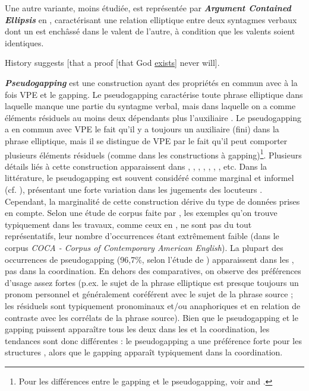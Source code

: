 Une autre variante, moins étudiée, est représentée par \textbf{\textit{Argument Contained Ellipsis}} \citep{Kennedy1994} en , caractérisant une relation elliptique entre deux syntagmes verbaux dont un est enchâssé dans le valent de l’autre, à condition que les valents soient identiques.

\ea
History suggests [that a proof [that God \uline{exists}] never will]. \label{ch1:ex72}   
\z

\textbf{\textit{Pseudogapping}} \citep{Levin1986} est une construction ayant des propriétés en commun avec à la fois VPE et le gapping. Le pseudogapping caractérise toute phrase elliptique dans laquelle manque une partie du syntagme verbal, mais dans laquelle on a comme éléments résiduels au moins deux dépendants plus l’auxiliaire . Le pseudogapping a en commun avec VPE le fait qu’il y a toujours un auxiliaire (fini) dans la phrase elliptique, mais il se distingue de VPE par le fait qu’il peut comporter plusieurs éléments résiduels (comme dans les constructions à gapping)\footnote{Pour les différences entre le gapping et le pseudogapping, voir \citet{Hoeksema2006} and \citet{Johnson2009}.}. Plusieurs détails liés à cette construction apparaissent dans \citet{Jayaseelan1990}, \citet{Lasnik1999}, \citet{Hoeksema2006}, \citet{KubotaEtAl2014}, \citet{Miller1990,Miller2014a}, \citet{Gengel2013}, \citet{Thoms2016}, etc. Dans la littérature, le pseudogapping est souvent considéré comme marginal et informel (cf. \citealt{Lasnik1999}), présentant une forte variation dans les jugements des locuteurs \citep{Hoeksema2006}. Cependant, la marginalité de cette construction dérive du type de données prises en compte. Selon une étude de corpus faite par \citet{Miller2014a}, les exemples qu’on trouve typiquement dans les travaux, comme ceux en , ne sont pas du tout représentatifs, leur nombre d’occurrences étant extrêmement faible (dans le corpus \textit{COCA - Corpus of Contemporary American English}). La plupart des occurrences de pseudogapping (96,7\%, selon l’étude de \citealt{Miller2014a}) apparaissent dans les  , pas dans la coordination. En dehors des comparatives, on observe des préférences d’usage assez fortes (p.ex. le sujet de la phrase elliptique est presque toujours un pronom personnel et généralement coréférent avec le sujet de la phrase source ; les résiduels sont typiquement pronominaux et/ou anaphoriques et en relation de contraste avec les corrélats de la phrase source). Bien que le pseudogapping et le gapping puissent apparaître tous les deux dans les  et la coordination, les tendances sont donc différentes \citep{Hoeksema2006} : le pseudogapping a une préférence forte pour les structures , alors que le gapping apparaît typiquement dans la coordination. 

